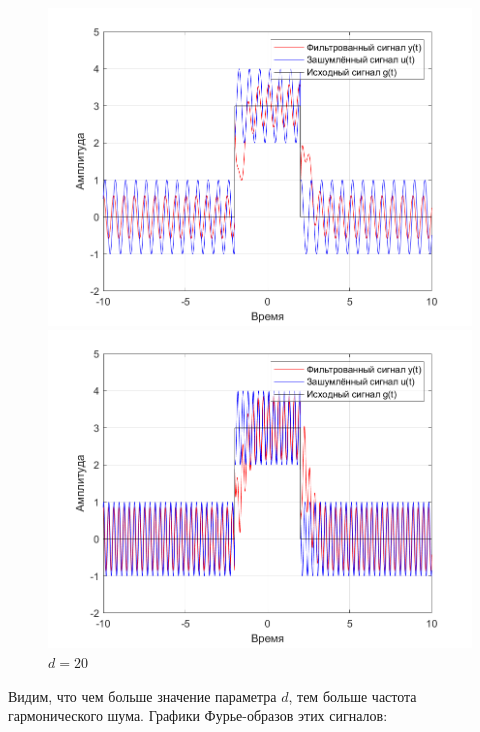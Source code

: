 \documentclass[a4paper]{article}
\begin{document}
\begin{figure}[H]
    \begin{minipage}{0.5\textwidth}
        \centering
        \includegraphics[width=\linewidth]{ex1_2/a1=0_a2=25_b1=10.5_b2=25_d=10/h2.png}
        \caption{$d=10$}
    \end{minipage}
    \begin{minipage}{0.5\textwidth}
        \centering
        \includegraphics[width=\linewidth]{ex1_2/a1=0_a2=25_b1=10.5_b2=25_d=20/h2.png}
        \caption{$d=20$}
    \end{minipage}
\end{figure}

Видим, что чем больше значение параметра $d$, тем больше частота гармонического шума. Графики Фурье-образов этих сигналов:
\end{document}
